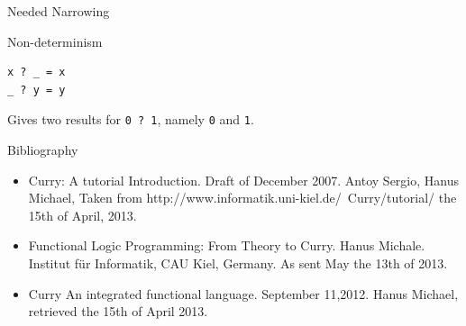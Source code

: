 \documentclass{beamer}
\begin{document}
\begin{section}{Needed Narrowing}
\begin{subsection}{Non-determinism}
\begin{frame}[fragile]
\begin{verbatim}
x ? _ = x
_ ? y = y
\end{verbatim}

  Gives two results for \verb|0 ? 1|, namely \verb|0| and \verb|1|.
  
\end{frame}

\end{subsection}
\end{section}
\begin{section}{Bibliography}
  \begin{frame}
    \begin{itemize}
    \item Curry: A tutorial Introduction. Draft of December 2007. Antoy Sergio, Hanus Michael, Taken from http://www.informatik.uni-kiel.de/~Curry/tutorial/ the 15th of April, 2013.


    \item Functional Logic Programming: From Theory to Curry. Hanus Michale. Institut f\"ur Informatik, CAU Kiel, Germany. As sent May the 13th of 2013.

    \item Curry An integrated functional language. September 11,2012. Hanus Michael, retrieved the 15th of April 2013.
      
    \end{itemize}

\end{frame}
\end{section}
\end{document}
